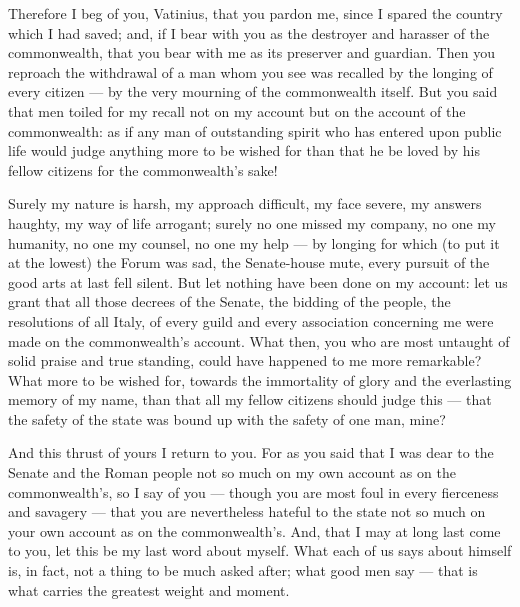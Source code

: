  Therefore I beg of you, Vatinius, that you pardon me, since I spared the country which I had saved; and, if I bear with you as the destroyer and harasser of the commonwealth, that you bear with me as its preserver and guardian. Then you reproach the withdrawal of a man whom you see was recalled by the longing of every citizen --- by the very mourning of the commonwealth itself. But you said that men toiled for my recall not on my account but on the account of the commonwealth: as if any man of outstanding spirit who has entered upon public life would judge anything more to be wished for than that he be loved by his fellow citizens for the commonwealth's sake!

 Surely my nature is harsh, my approach difficult, my face severe, my answers haughty, my way of life arrogant; surely no one missed my company, no one my humanity, no one my counsel, no one my help --- by longing for which (to put it at the lowest) the Forum was sad, the Senate-house mute, every pursuit of the good arts at last fell silent. But let nothing have been done on my account: let us grant that all those decrees of the Senate, the bidding of the people, the resolutions of all Italy, of every guild and every association concerning me were made on the commonwealth's account. What then, you who are most untaught of solid praise and true standing, could have happened to me more remarkable? What more to be wished for, towards the immortality of glory and the everlasting memory of my name, than that all my fellow citizens should judge this --- that the safety of the state was bound up with the safety of one man, mine?

 And this thrust of yours I return to you. For as you said that I was dear to the Senate and the Roman people not so much on my own account as on the commonwealth's, so I say of you --- though you are most foul in every fierceness and savagery --- that you are nevertheless hateful to the state not so much on your own account as on the commonwealth's. And, that I may at long last come to you, let this be my last word about myself. What each of us says about himself is, in fact, not a thing to be much asked after; what good men say --- that is what carries the greatest weight and moment.

